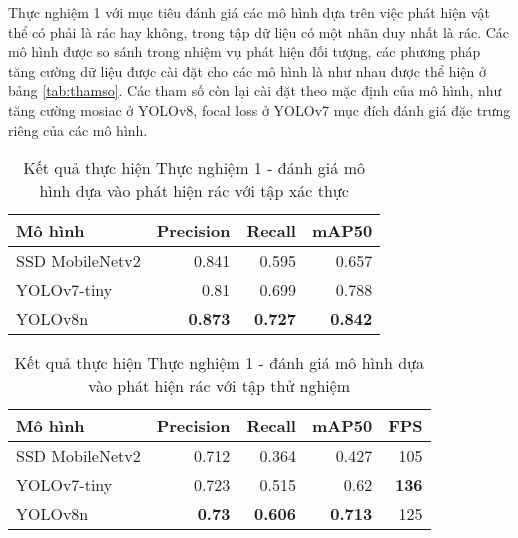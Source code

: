 \documentclass[../the.tex]{subfiles}
\begin{document}
{\fontsize{13}{12} \selectfont

Thực nghiệm 1 với mục tiêu đánh giá các mô hình dựa trên việc phát hiện vật thể có phải là rác hay không, trong tập dữ liệu có một nhãn duy nhất là rác.
Các mô hình được so sánh trong nhiệm vụ phát hiện đối tượng, các phương pháp tăng cường dữ liệu được cài đặt cho các mô hình là như nhau được thể hiện ở bảng \ref{tab:thamso}.
Các tham số còn lại cài đặt theo mặc định của mô hình, như tăng cường mosiac ở YOLOv8, focal loss ở YOLOv7 mục đích đánh giá đặc trưng riêng của các mô hình.

}
\begin{table}[h!]
    \centering
    \caption{Kết quả thực hiện Thực nghiệm 1 - đánh giá mô hình dựa vào phát hiện rác với tập xác thực}
    \begin{tabular}{|l|r|r|r|}
        \hline
        \textbf{Mô hình}  & \textbf{Precision} & \textbf{Recall} & \textbf{mAP50} \\ \hline
        SSD   MobileNetv2 & 0.841              & 0.595           & 0.657          \\ \hline
        YOLOv7-tiny       & 0.81               & 0.699           & 0.788          \\ \hline
        YOLOv8n           & \textbf{0.873}     & \textbf{0.727}  & \textbf{0.842} \\ \hline
    \end{tabular}
    \label{tab:thucnghiem1.1}
\end{table}

\begin{table}[h!]
    \centering
    \caption{Kết quả thực hiện Thực nghiệm 1 - đánh giá mô hình dựa vào phát hiện rác với tập thử nghiệm}
    \begin{tabular}{|l|r|r|r|r|}
        \hline
        \textbf{Mô hình} & \textbf{Precision} & \textbf{Recall} & \textbf{mAP50} & \multicolumn{1}{l|}{\textbf{FPS}} \\ \hline
        SSD MobileNetv2  & 0.712              & 0.364           & 0.427          & 105                               \\ \hline
        YOLOv7-tiny      & 0.723              & 0.515           & 0.62           & \textbf{136}                      \\ \hline
        YOLOv8n          & \textbf{0.73}      & \textbf{0.606}  & \textbf{0.713} & 125                               \\ \hline
    \end{tabular}
    \label{tab:thucnghiem1.2}
\end{table}
\end{document}
